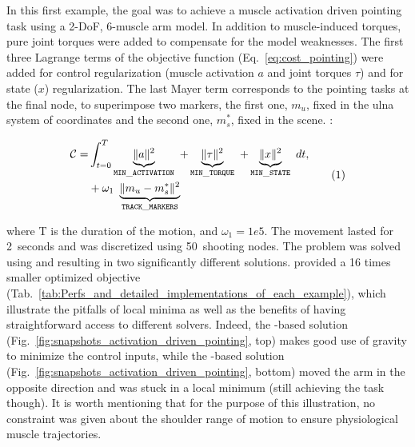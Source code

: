 In this first example, the goal was to achieve a muscle activation driven pointing task using a 2-DoF, 6-muscle arm model. 
In addition to muscle-induced torques, pure joint torques were added to compensate for the model weaknesses.
The first three Lagrange terms of the objective function (Eq.~\ref{eq:cost_pointing}) were added for control regularization (muscle activation $a$ and joint torques $\tau$) and for state ($x$) regularization.
The last Mayer term corresponds to the pointing tasks at the final node, to superimpose two markers, the first one, $m_u$, fixed in the ulna system of coordinates and the second one, $m^*_s$, fixed in the scene.
:

\[
\begin{aligned}
	\mathcal{C} = &\int_{t=0}^T\underbrace{\|a\|^2}_{\mathtt{MIN\_ACTIVATION}}~
	+\underbrace{\|\tau\|^2}_{\mathtt{MIN\_TORQUE}}~
	+\underbrace{\|x\|^2}_{\mathtt{MIN\_STATE}}~ dt,\\
	&+ \omega_1~\underbrace{\|m_u-m^*_s\|^2}_{\mathtt{TRACK\_MARKERS}}~
\end{aligned}
\addtag
\label{eq:cost_pointing}
\]
%

\noindent where T is the duration of the motion, and $\omega_1=1e5$.
The movement lasted for 2~seconds and was discretized using 50~shooting nodes.
The problem was solved using \ipopt and \acados resulting in two significantly different solutions.
\acados provided a 16 times smaller optimized objective (Tab.~\ref{tab:Perfs_and_detailed_implementations_of_each_example}), which illustrate the pitfalls of local minima as well as the benefits of having straightforward access to different solvers.  
Indeed, the \acados-based solution (Fig.~\ref{fig:snapshots_activation_driven_pointing}, top) makes good use of gravity to minimize the control inputs, while the \ipopt-based solution (Fig.~\ref{fig:snapshots_activation_driven_pointing}, bottom) moved the arm in the opposite direction and was stuck in a local minimum (still achieving the task though). 
It is worth mentioning that for the purpose of this illustration, no constraint was given about the shoulder range of motion to ensure physiological muscle trajectories. 

